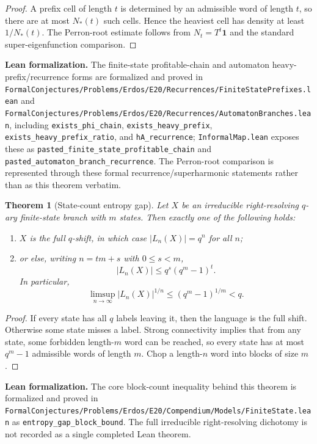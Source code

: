 \documentclass[11pt]{article}
\newtheorem{theorem}{Theorem}[section]
\theoremstyle{definition}
\newcommand{\1}{\mathbf{1}}
\newcommand{\leannote}[1]{\par\smallskip\noindent\textbf{Lean formalization.} #1\par\smallskip}
\begin{document}
\begin{proof}
A prefix cell of length $t$ is determined by an admissible word of length $t$, so there are at most $N_*(t)$ such cells. Hence the heaviest cell has density at least $1/N_*(t)$. The Perron-root estimate follows from $N_t=T^t\1$ and the standard super-eigenfunction comparison.
\end{proof}

\leannote{The finite-state profitable-chain and automaton heavy-prefix/recurrence forms are formalized and proved in \texttt{FormalConjectures/Problems/Erdos/E20/Recurrences/FiniteStatePrefixes.lean} and \texttt{FormalConjectures/Problems/Erdos/E20/Recurrences/AutomatonBranches.lean}, including \texttt{exists\_phi\_chain}, \texttt{exists\_heavy\_prefix}, \texttt{exists\_heavy\_prefix\_ratio}, and \texttt{hA\_recurrence}; \texttt{InformalMap.lean} exposes these as \texttt{pasted\_finite\_state\_profitable\_chain} and \texttt{pasted\_automaton\_branch\_recurrence}. The Perron-root comparison is represented through these formal recurrence/superharmonic statements rather than as this theorem verbatim.}

\begin{theorem}[State-count entropy gap]\label{thm:finite-state-statecount}
Let $X$ be an irreducible right-resolving $q$-ary finite-state branch with $m$ states. Then exactly one of the following holds:
\begin{enumerate}[label=(\roman*),leftmargin=2.2em]
\item $X$ is the full $q$-shift, in which case $|L_n(X)|=q^n$ for all $n$;
\item or else, writing $n=tm+s$ with $0\le s<m$,
\[
|L_n(X)|\le q^s (q^m-1)^t.
\]
In particular,
\[
\limsup_{n\to\infty} |L_n(X)|^{1/n}\le (q^m-1)^{1/m}<q.
\]
\end{enumerate}
\end{theorem}

\begin{proof}
If every state has all $q$ labels leaving it, then the language is the full shift. Otherwise some state misses a label. Strong connectivity implies that from any state, some forbidden length-$m$ word can be reached, so every state has at most $q^m-1$ admissible words of length $m$. Chop a length-$n$ word into blocks of size $m$.
\end{proof}

\leannote{The core block-count inequality behind this theorem is formalized and proved in \texttt{FormalConjectures/Problems/Erdos/E20/Compendium/Models/FiniteState.lean} as \texttt{entropy\_gap\_block\_bound}. The full irreducible right-resolving dichotomy is not recorded as a single completed Lean theorem.}
\end{document}
